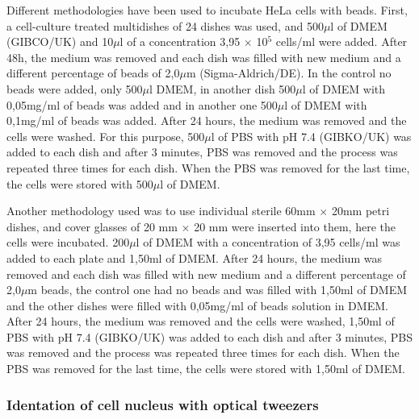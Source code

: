 \documentclass[12pt, a4paper]{article} %
\begin{document}
	\setlength{\parskip}{4mm}
	
	Different methodologies have been used to incubate HeLa cells with beads. First, a cell-culture treated multidishes of 24 dishes was used, and 500$\mu$l of DMEM (GIBCO/UK) and 10$\mu$l of a concentration 3,95 $\times$ 10$^{5}$ cells/ml were added. After 48h, the medium was removed and each dish was filled with new medium and a different percentage of beads of 2,0$\mu$m (Sigma-Aldrich/DE). In the control no beads were added, only 500$\mu$l DMEM, in another dish 500$\mu$l of DMEM with 0,05mg/ml of beads was added and in another one 500$\mu$l of DMEM with 0,1mg/ml of beads was added. After 24 hours, the medium was removed and the cells were washed. For this purpose, 500$\mu$l of PBS with pH 7.4 (GIBKO/UK) was added to each dish and after 3 minutes, PBS was removed and the process was repeated three times for each dish. When the PBS was removed for the last time, the cells were stored with 500$\mu$l of DMEM.
	
	Another methodology used was to use individual sterile 60mm $\times$ 20mm petri dishes, and cover glasses of 20 mm $\times$ 20 mm were inserted into them, here the cells were incubated. 200$\mu$l of DMEM with a concentration of 3,95 cells/ml was added to each plate and 1,50ml of DMEM. After 24 hours, the medium was removed and each dish was filled with new medium and a different percentage of 2,0$\mu$m beads, the control one had no beads and was filled with 1,50ml of DMEM and the other dishes were filled with 0,05mg/ml of beads solution in DMEM. After 24 hours, the medium was removed and the cells were washed, 1,50ml of PBS with pH 7.4 (GIBKO/UK) was added to each dish and after 3 minutes, PBS was removed and the process was repeated three times for each dish. When the PBS was removed for the last time, the cells were stored with 1,50ml of DMEM. 
	
	\setlength{\parskip}{0mm}
	
	\subsubsection{Identation of cell nucleus with optical tweezers}
	
\end{document}
